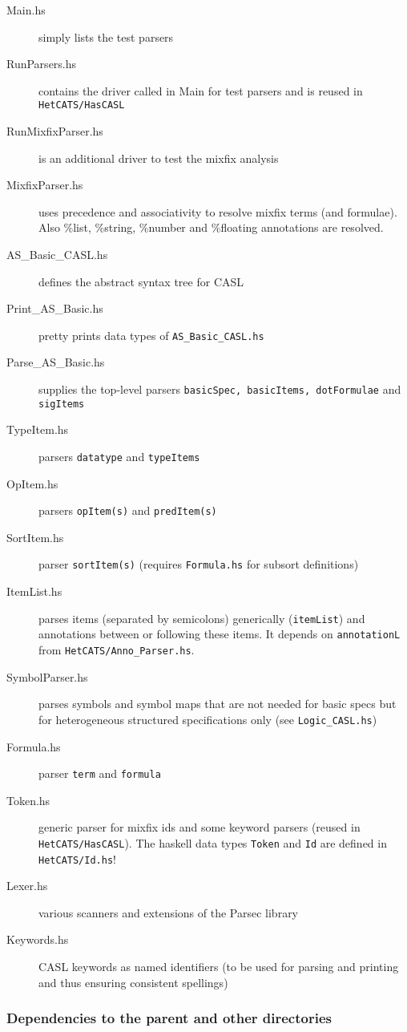 \documentclass{article}
\begin{document}
\begin{description}
\item[Main.hs] simply lists the test parsers 
\item[RunParsers.hs] contains the driver called in Main for test parsers and is reused in \texttt{HetCATS/HasCASL}
\item[RunMixfixParser.hs] is an additional driver to test the mixfix analysis
\item[MixfixParser.hs] uses precedence and associativity to resolve
  mixfix terms (and formulae). Also \%list, \%string, \%number and
  \%floating annotations are resolved. 
\item[AS\_Basic\_CASL.hs] defines the abstract syntax tree for CASL
\item[Print\_AS\_Basic.hs] pretty prints data types of
  \texttt{AS\_Basic\_CASL.hs}
\item[Parse\_AS\_Basic.hs] supplies the top-level parsers \texttt{basicSpec,
  basicItems, dotFormulae} and \texttt{sigItems}
\item[TypeItem.hs] parsers \texttt{datatype} and \texttt{typeItems}
\item[OpItem.hs] parsers \texttt{opItem(s)} and \texttt{predItem(s)}
\item[SortItem.hs] parser \texttt{sortItem(s)} (requires \texttt{Formula.hs} for subsort definitions)
\item[ItemList.hs] parses items (separated by semicolons) generically
  (\texttt{itemList}) and annotations between or following these
  items. It depends on \texttt{annotationL} from
  \texttt{HetCATS/Anno\_Parser.hs}.
\item[SymbolParser.hs] parses symbols and symbol maps that are not
  needed for basic specs but for heterogeneous structured
  specifications only (see \texttt{Logic\_CASL.hs})
\item[Formula.hs] parser \texttt{term} and \texttt{formula}
\item[Token.hs] generic parser for mixfix ids and some keyword parsers
  (reused in \texttt{HetCATS/HasCASL}). The haskell data types
  \texttt{Token} and \texttt{Id} are defined in \texttt{HetCATS/Id.hs}!
\item[Lexer.hs] various scanners and extensions of the Parsec library 
\item[Keywords.hs] CASL keywords as named identifiers (to be used
  for parsing and printing and thus ensuring consistent spellings)
\end{description}

\subsubsection*{Dependencies to the parent and other directories}
\label{sec:casl}
\end{document}
